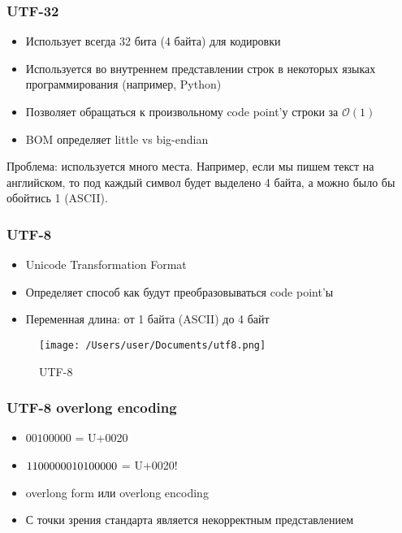   \subsubsection{UTF-32}
    \begin{itemize}
      \item Использует всегда 32 бита (4 байта) для кодировки
      \item Используется во внутреннем представлении строк в некоторых языках программирования (например, Python)
      \item Позволяет обращаться к произвольному code point'у строки за $\mathcal{O}(1)$
      \item BOM определяет little vs big-endian
    \end{itemize}
    Проблема: используется много места. Например, если мы пишем текст на английском, то под каждый символ будет выделено 4 байта, а можно было бы обойтись 1 (ASCII).
  
  \subsubsection{UTF-8}
    \begin{itemize}
      \item Unicode Transformation Format
      \item Определяет способ как будут преобразовываться code point'ы
      \item Переменная длина: от 1 байта (ASCII) до 4 байт
    \end{itemize}
    
    \begin{figure}[H]
    \centering
  \texttt{[image: /Users/user/Documents/utf8.png]}
  \caption{UTF-8}
  \label{fig:utf8}
\end{figure}
  
  \subsubsection*{UTF-8 overlong encoding}
    \begin{itemize}
      \item $00100000$ = U+0020
      \item $11000000 \space 10100000$ = U+0020!
      \item overlong form или overlong encoding
      \item С точки зрения стандарта является некорректным представлением
    \end{itemize}